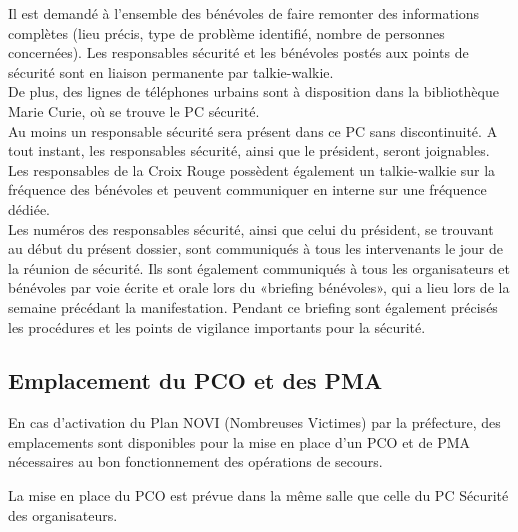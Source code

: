 \documentclass[hidelinks, paper=a4, fontsize=13pt]{report}
\begin{document}
Il est demandé à l’ensemble des bénévoles de faire remonter des informations complètes (lieu précis, type de problème identifié, nombre de personnes concernées). Les responsables sécurité et les bénévoles postés aux points de sécurité sont en liaison permanente par talkie-walkie. \\

De plus, des lignes de téléphones urbains sont à disposition dans la bibliothèque Marie Curie, où se trouve le PC sécurité. \\
Au moins un responsable sécurité sera présent dans ce PC sans discontinuité. A tout instant, les responsables sécurité, ainsi que le président, seront joignables.\\

Les responsables de la Croix Rouge possèdent également un talkie-walkie sur la fréquence des bénévoles et peuvent communiquer en interne sur une fréquence dédiée. \\

Les numéros des responsables sécurité, ainsi que celui du président, se trouvant au début du présent dossier, sont communiqués à tous les intervenants le jour de la réunion de sécurité. Ils sont également communiqués à tous les organisateurs et bénévoles par voie écrite et orale lors du «briefing bénévoles», qui a lieu lors de la semaine précédant la manifestation. Pendant ce briefing sont également précisés les procédures et les points de vigilance importants pour la sécurité.\\

\subsection{Emplacement du PCO et des PMA}
\label{refProcedurePMA}

En cas d’activation du Plan NOVI (Nombreuses Victimes) par la préfecture, des emplacements sont disponibles pour la mise en place d'un PCO et de PMA nécessaires au bon fonctionnement des opérations de secours. 

La mise en place du PCO est prévue dans la même salle que celle du PC Sécurité des organisateurs. 
\end{document}
